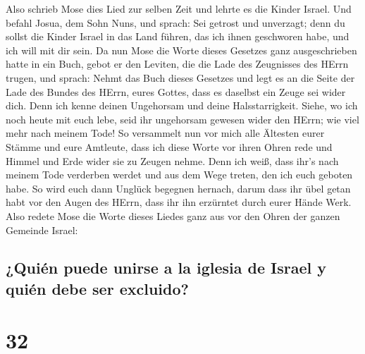  Also schrieb Mose dies Lied zur selben Zeit und lehrte
es die Kinder Israel.  Und befahl Josua, dem Sohn Nuns,
und sprach: Sei getrost und unverzagt; denn du sollst die Kinder Israel
in das Land führen, das ich ihnen geschworen habe, und ich will mit dir
sein.  Da nun Mose die Worte dieses Gesetzes ganz
ausgeschrieben hatte in ein Buch,  gebot er den Leviten,
die die Lade des Zeugnisses des HErrn trugen, und sprach:
 Nehmt das Buch dieses Gesetzes und legt es an die Seite
der Lade des Bundes des HErrn, eures Gottes, dass es daselbst ein Zeuge
sei wider dich.  Denn ich kenne deinen Ungehorsam und
deine Halsstarrigkeit. Siehe, wo ich noch heute mit euch lebe, seid ihr
ungehorsam gewesen wider den HErrn; wie viel mehr nach meinem Tode!
 So versammelt nun vor mich alle Ältesten eurer Stämme
und eure Amtleute, dass ich diese Worte vor ihren Ohren rede und Himmel
und Erde wider sie zu Zeugen nehme.  Denn ich weiß, dass
ihr's nach meinem Tode verderben werdet und aus dem Wege treten, den ich
euch geboten habe. So wird euch dann Unglück begegnen hernach, darum
dass ihr übel getan habt vor den Augen des HErrn, dass ihr ihn erzürntet
durch eurer Hände Werk.  Also redete Mose die Worte
dieses Liedes ganz aus vor den Ohren der ganzen Gemeinde Israel:

\hypertarget{quiuxe9n-puede-unirse-a-la-iglesia-de-israel-y-quiuxe9n-debe-ser-excluido}{%
\subsection{¿Quién puede unirse a la iglesia de Israel y quién debe ser
excluido?}\label{quiuxe9n-puede-unirse-a-la-iglesia-de-israel-y-quiuxe9n-debe-ser-excluido}}

\hypertarget{section-31}{%
\section{32}\label{section-31}}

